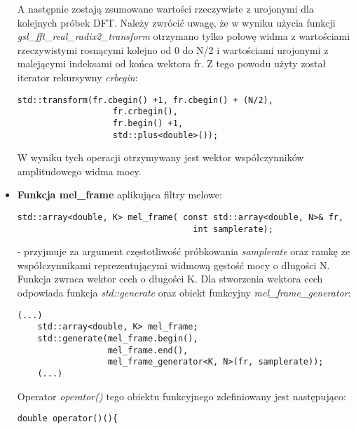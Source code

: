 \begin{itemize}
A następnie zostają zsumowane wartości rzeczywiste z urojonymi dla kolejnych próbek DFT. Należy zwrócić uwagę, że w wyniku użycia funkcji \textit{gsl\_fft\_real\_radix2\_transform} otrzymano tylko połowę widma z wartościami rzeczywistymi rosnącymi kolejno od 0 do N/2 i wartościami urojonymi z malejącymi indeksami od końca wektora fr. Z tego powodu użyty został iterator rekursywny \textit{crbegin}:

\begin{lstlisting}[style=lst:cpp]
    std::transform(fr.cbegin() +1, fr.cbegin() + (N/2),
                   fr.crbegin(),
                   fr.begin() +1,
                   std::plus<double>());
\end{lstlisting}
W wyniku tych operacji otrzymywany jest wektor współczynników amplitudowego widma mocy.

\item{\textbf{Funkcja mel\_frame} aplikująca filtry melowe:
 \begin{lstlisting}[style=lst:cpp]
  std::array<double, K> mel_frame( const std::array<double, N>& fr,
                                   int samplerate);
\end{lstlisting}
}
- przyjmuje za argument częstotliwość próbkowania \textit{samplerate} oraz ramkę ze współczynnikami reprezentującymi widmową gęstość mocy o długości N. Funkcja zwraca wektor cech o długości K. Dla stworzenia wektora cech odpowiada funkcja \textit{std::generate} oraz obiekt funkcyjny \textit{mel\_frame\_generator}:

 \begin{lstlisting}[style=lst:cpp]
    (...)
    std::array<double, K> mel_frame;
    std::generate(mel_frame.begin(),
                  mel_frame.end(),
                  mel_frame_generator<K, N>(fr, samplerate));
    (...)
 \end{lstlisting}

Operator \textit{operator()} tego obiektu funkcyjnego zdefiniowany jest następująco:

 \begin{lstlisting}[style=lst:cpp]
    double operator()(){
 \end{lstlisting}


\end{itemize}
